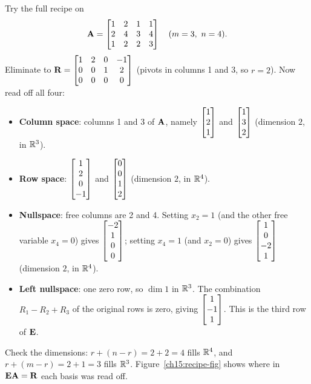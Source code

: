 \begin{labbox}
Try the full recipe on
\[
  \mathbf{A} = \begin{bmatrix} 1 & 2 & 1 & 1\\ 2 & 4 & 3 & 4\\ 1 & 2 & 2 & 3 \end{bmatrix}
  \quad (m=3,\ n=4).
\]
Eliminate to $\mathbf{R}=\begin{bmatrix}1&2&0&-1\\0&0&1&2\\0&0&0&0\end{bmatrix}$ (pivots in columns 1
and 3, so $r=2$). Now read off all four:
\begin{itemize}
  \item \textbf{Column space}: columns 1 and 3 of $\mathbf{A}$, namely $\begin{bmatrix}1\\2\\1\end{bmatrix}$ and
  $\begin{bmatrix}1\\3\\2\end{bmatrix}$ (dimension $2$, in $\mathbb{R}^3$).
  \item \textbf{Row space}: $\begin{bmatrix}1\\2\\0\\-1\end{bmatrix}$ and $\begin{bmatrix}0\\0\\1\\2\end{bmatrix}$ (dimension $2$, in
  $\mathbb{R}^4$).
  \item \textbf{Nullspace}: free columns are 2 and 4. Setting $x_2=1$ (and the other free variable $x_4=0$) gives
  $\begin{bmatrix}-2\\1\\0\\0\end{bmatrix}$; setting $x_4=1$ (and $x_2=0$) gives $\begin{bmatrix}1\\0\\-2\\1\end{bmatrix}$ (dimension $2$, in $\mathbb{R}^4$).
  \item \textbf{Left nullspace}: one zero row, so $\dim 1$ in $\mathbb{R}^3$. The combination
  $R_1-R_2+R_3$ of the original rows is zero, giving $\begin{bmatrix}1\\-1\\1\end{bmatrix}$. This is the third row
  of $\mathbf{E}$.
\end{itemize}
Check the dimensions: $r+(n-r)=2+2=4$ fills $\mathbb{R}^4$, and $r+(m-r)=2+1=3$ fills $\mathbb{R}^3$.
Figure~\ref{ch15:recipe-fig} shows where in $\mathbf{E}\mathbf{A}=\mathbf{R}$ each basis was read off.
\end{labbox}

